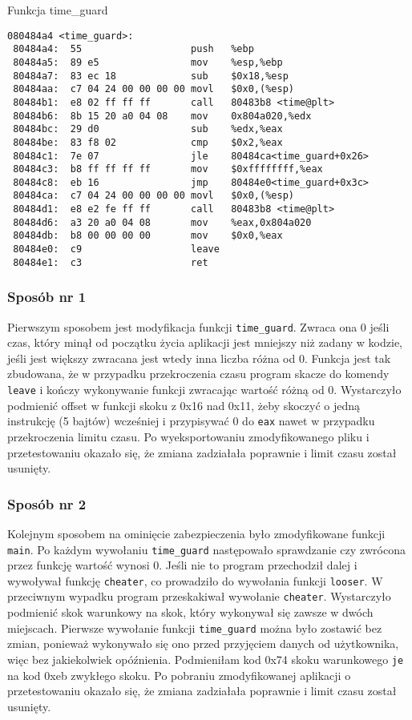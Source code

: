 \documentclass[12pt,a4paper,titlepage]{article}
\begin{document}
\begin{listing}[H]
\caption{Funkcja time\_guard}
\begin{verbatim}
080484a4 <time_guard>:
 80484a4:  55                   push   %ebp
 80484a5:  89 e5                mov    %esp,%ebp
 80484a7:  83 ec 18             sub    $0x18,%esp
 80484aa:  c7 04 24 00 00 00 00 movl   $0x0,(%esp)
 80484b1:  e8 02 ff ff ff       call   80483b8 <time@plt>
 80484b6:  8b 15 20 a0 04 08    mov    0x804a020,%edx
 80484bc:  29 d0                sub    %edx,%eax
 80484be:  83 f8 02             cmp    $0x2,%eax
 80484c1:  7e 07                jle    80484ca<time_guard+0x26>
 80484c3:  b8 ff ff ff ff       mov    $0xffffffff,%eax
 80484c8:  eb 16                jmp    80484e0<time_guard+0x3c>
 80484ca:  c7 04 24 00 00 00 00 movl   $0x0,(%esp)
 80484d1:  e8 e2 fe ff ff       call   80483b8 <time@plt>
 80484d6:  a3 20 a0 04 08       mov    %eax,0x804a020
 80484db:  b8 00 00 00 00       mov    $0x0,%eax
 80484e0:  c9                   leave
 80484e1:  c3                   ret
\end{verbatim}
\end{listing}

\subsubsection{Sposób nr 1}
Pierwszym sposobem jest modyfikacja funkcji \texttt{time_guard}. Zwraca ona 0 jeśli czas, który minął od początku życia aplikacji jest mniejszy niż zadany w kodzie, jeśli jest większy zwracana jest wtedy inna liczba różna od 0. Funkcja jest tak zbudowana, że w przypadku przekroczenia czasu program skacze do komendy \texttt{leave} i kończy wykonywanie funkcji zwracając wartość różną od 0. Wystarczyło podmienić offset w funkcji skoku z 0x16 nad 0x11, żeby skoczyć o jedną instrukcję (5 bajtów) wcześniej i przypisywać 0 do \texttt{eax} nawet w przypadku przekroczenia limitu czasu. Po wyeksportowaniu zmodyfikowanego pliku i przetestowaniu okazało się, że zmiana zadziałała poprawnie i limit czasu został usunięty.

\subsubsection{Sposób nr 2}
Kolejnym sposobem na ominięcie zabezpieczenia było zmodyfikowane funkcji \texttt{main}. Po każdym wywołaniu \texttt{time_guard} następowało sprawdzanie czy zwrócona przez funkcję wartość wynosi 0. Jeśli nie to program przechodził dalej i wywoływał funkcję \texttt{cheater}, co prowadziło do wywołania funkcji \texttt{looser}. W przeciwnym wypadku program przeskakiwał wywołanie \texttt{cheater}. Wystarczyło podmienić skok warunkowy na skok, który wykonywał się zawsze w dwóch miejscach. Pierwsze wywołanie funkcji \texttt{time_guard} można było zostawić bez zmian, ponieważ wykonywało się ono przed przyjęciem danych od użytkownika, więc bez jakiekolwiek opóźnienia. Podmieniłam kod 0x74 skoku warunkowego \texttt{je} na kod 0xeb zwykłego skoku. Po pobraniu zmodyfikowanej aplikacji o przetestowaniu okazało się, że zmiana zadziałała poprawnie i limit czasu został usunięty. 
\end{document}
